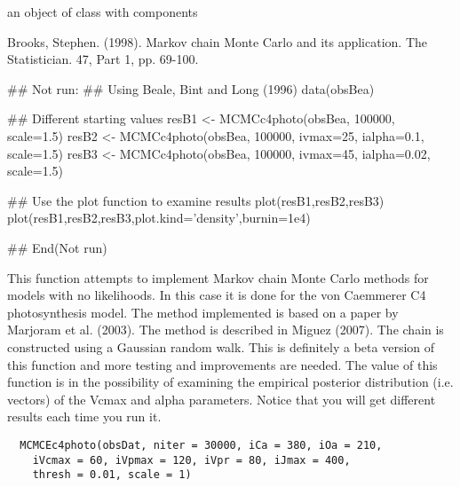 \documentclass[letterpaper]{book}
\begin{document}
%
\begin{Value}
an object of class  with components
\end{Value}
%
\begin{References}\relax
Brooks, Stephen. (1998). Markov chain Monte Carlo and its
application. The Statistician. 47, Part 1, pp. 69-100.
\end{References}
%
\begin{Examples}
\begin{ExampleCode}
## Not run: 
## Using Beale, Bint and Long (1996)
data(obsBea)

## Different starting values
resB1 <- MCMCc4photo(obsBea, 100000, scale=1.5)
resB2 <- MCMCc4photo(obsBea, 100000, ivmax=25, ialpha=0.1, scale=1.5)
resB3 <- MCMCc4photo(obsBea, 100000, ivmax=45, ialpha=0.02, scale=1.5)

## Use the plot function to examine results
plot(resB1,resB2,resB3)
plot(resB1,resB2,resB3,plot.kind='density',burnin=1e4)


## End(Not run)
\end{ExampleCode}
\end{Examples}
%
\begin{Description}\relax
This function attempts to implement Markov chain Monte
Carlo methods for models with no likelihoods. In this
case it is done for the von Caemmerer C4 photosynthesis
model.  The method implemented is based on a paper by
Marjoram et al. (2003).  The method is described in
Miguez (2007). The chain is constructed using a Gaussian
random walk. This is definitely a beta version of this
function and more testing and improvements are needed.
The value of this function is in the possibility of
examining the empirical posterior distribution (i.e.
vectors) of the Vcmax and alpha parameters. Notice that
you will get different results each time you run it.
\end{Description}
%
\begin{Usage}
\begin{verbatim}
  MCMCEc4photo(obsDat, niter = 30000, iCa = 380, iOa = 210,
    iVcmax = 60, iVpmax = 120, iVpr = 80, iJmax = 400,
    thresh = 0.01, scale = 1)
\end{verbatim}
\end{Usage}
%
\end{document}
